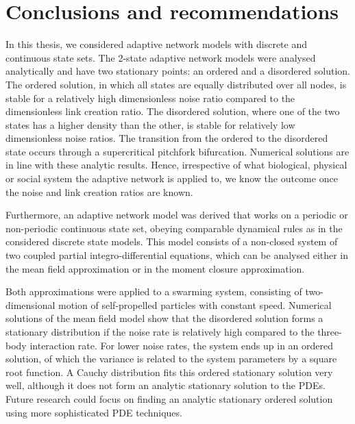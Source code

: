 \chapter{Conclusions and recommendations}

In this thesis, we considered adaptive network models with discrete and continuous state sets. The 2-state adaptive network models were analysed analytically and have two stationary points: an ordered and a disordered solution. The ordered solution, in which all states are equally distributed over all nodes, is stable for a relatively high dimensionless noise ratio compared to the dimensionless link creation ratio. The disordered solution, where one of the two states has a higher density than the other, is stable for relatively low dimensionless noise ratios. The transition from the ordered to the disordered state occurs through a supercritical pitchfork bifurcation. Numerical solutions are in line with these analytic results. Hence, irrespective of what biological, physical or social system the adaptive network is applied to, we know the outcome once the noise and link creation ratios are known. 

Furthermore, an adaptive network model was derived that works on a periodic or non-periodic continuous state set, obeying comparable dynamical rules as in the considered discrete state models. This model consists of a non-closed system of two coupled partial integro-differential equations, which can be analysed either in the mean field approximation or in the moment closure approximation. 

Both approximations were applied to a swarming system, consisting of two-dimensional motion of self-propelled particles with constant speed. Numerical solutions of the mean field model show that the disordered solution forms a stationary distribution if the noise rate is relatively high compared to the three-body interaction rate. For lower noise rates, the system ends up in an ordered solution, of which the variance is related to the system parameters by a square root function. A Cauchy distribution fits this ordered stationary solution very well, although it does not form an analytic stationary solution to the PDEs. Future research could focus on finding an analytic stationary ordered solution using more sophisticated PDE techniques.  

